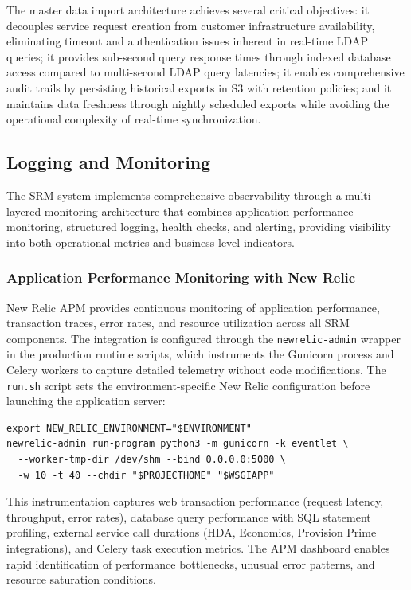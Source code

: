 The master data import architecture achieves several critical objectives: it decouples service request creation from customer infrastructure availability, eliminating timeout and authentication issues inherent in real-time LDAP queries; it provides sub-second query response times through indexed database access compared to multi-second LDAP query latencies; it enables comprehensive audit trails by persisting historical exports in S3 with retention policies; and it maintains data freshness through nightly scheduled exports while avoiding the operational complexity of real-time synchronization.


\subsection{Logging and Monitoring}

The SRM system implements comprehensive observability through a multi-layered monitoring architecture that combines application performance monitoring, structured logging, health checks, and alerting, providing visibility into both operational metrics and business-level indicators.

\subsubsection{Application Performance Monitoring with New Relic}

New Relic APM provides continuous monitoring of application performance, transaction traces, error rates, and resource utilization across all SRM components. The integration is configured through the \texttt{newrelic-admin} wrapper in the production runtime scripts, which instruments the Gunicorn process and Celery workers to capture detailed telemetry without code modifications. The \texttt{run.sh} script sets the environment-specific New Relic configuration before launching the application server:

\begin{verbatim}
export NEW_RELIC_ENVIRONMENT="$ENVIRONMENT"
newrelic-admin run-program python3 -m gunicorn -k eventlet \
  --worker-tmp-dir /dev/shm --bind 0.0.0.0:5000 \
  -w 10 -t 40 --chdir "$PROJECTHOME" "$WSGIAPP"
\end{verbatim}

This instrumentation captures web transaction performance (request latency, throughput, error rates), database query performance with SQL statement profiling, external service call durations (HDA, Economics, Provision Prime integrations), and Celery task execution metrics. The APM dashboard enables rapid identification of performance bottlenecks, unusual error patterns, and resource saturation conditions.

